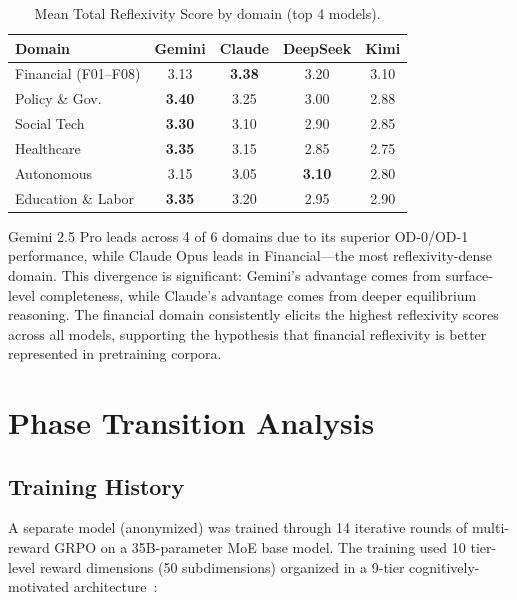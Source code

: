 \documentclass{article}
\begin{document}
\begin{table}[h]
\centering
\caption{Mean Total Reflexivity Score by domain (top 4 models).}
\label{tab:domain-breakdown}
\begin{tabular}{@{}lcccc@{}}
\toprule
\textbf{Domain} & \textbf{Gemini} & \textbf{Claude} & \textbf{DeepSeek} & \textbf{Kimi} \\
\midrule
Financial (F01--F08) & 3.13 & \textbf{3.38} & 3.20 & 3.10 \\
Policy \& Gov. & \textbf{3.40} & 3.25 & 3.00 & 2.88 \\
Social Tech & \textbf{3.30} & 3.10 & 2.90 & 2.85 \\
Healthcare & \textbf{3.35} & 3.15 & 2.85 & 2.75 \\
Autonomous & 3.15 & 3.05 & \textbf{3.10} & 2.80 \\
Education \& Labor & \textbf{3.35} & 3.20 & 2.95 & 2.90 \\
\bottomrule
\end{tabular}
\end{table}

Gemini 2.5 Pro leads across 4 of 6 domains due to its superior OD-0/OD-1 performance, while Claude Opus leads in Financial---the most reflexivity-dense domain. This divergence is significant: Gemini's advantage comes from surface-level completeness, while Claude's advantage comes from deeper equilibrium reasoning. The financial domain consistently elicits the highest reflexivity scores across all models, supporting the hypothesis that financial reflexivity is better represented in pretraining corpora.

\section{Phase Transition Analysis}
\label{sec:phase-transition}

\subsection{Training History}

A separate model (anonymized) was trained through 14 iterative rounds of multi-reward GRPO on a 35B-parameter MoE base model. The training used 10 tier-level reward dimensions (50 subdimensions) organized in a 9-tier cognitively-motivated architecture~\citep{zhang2026}:
\end{document}
